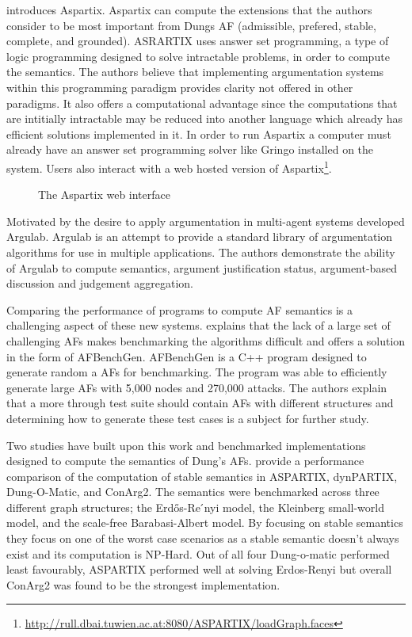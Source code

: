 \cite{egly2008aspartix} introduces Aspartix. Aspartix can compute the extensions that the authors consider to be most important from Dungs AF (admissible, prefered, stable, complete, and grounded). ASRARTIX uses answer set programming, a type of logic programming designed to solve intractable problems, in order to compute the semantics. The authors believe that implementing argumentation systems within this programming paradigm provides clarity not offered in other paradigms. It also offers a computational advantage since the computations that are intitially intractable may be reduced into another language which already has efficient solutions implemented in it. In order to run Aspartix a computer must already have an answer set programming solver like Gringo installed on the system. Users also interact with a web hosted version of Aspartix\footnote{\url{http://rull.dbai.tuwien.ac.at:8080/ASPARTIX/loadGraph.faces}}.

\begin{figure}
    \centering
    \hfill
    \caption{The Aspartix web interface}
    \label{fig:three graphs}
\end{figure}

Motivated by the desire to apply argumentation in multi-agent systems \cite{podlaszewski2011implementation} developed Argulab. Argulab is an attempt to provide a standard library of argumentation algorithms for use in multiple applications. The authors demonstrate the ability of Argulab to compute semantics, argument justification status, argument-based discussion and judgement aggregation.

Comparing the performance of programs to compute AF semantics is a challenging aspect of these new systems. \cite{cerutti2014generating} explains that the lack of a large set of challenging AFs makes benchmarking the algorithms difficult and offers a solution in the form of AFBenchGen.
AFBenchGen is a C++ program designed to generate random a AFs for benchmarking.
The program was able to efficiently generate large AFs with 5,000 nodes and 270,000 attacks. The authors explain that a more through test suite should contain AFs with different structures and determining how to generate these test cases is a subject for further study.

Two studies have built upon this work and benchmarked implementations designed to compute the semantics of Dung's AFs. \cite{bistarelli2014benchmarking} provide a performance comparison of the computation of stable semantics in ASPARTIX, dynPARTIX, Dung-O-Matic, and ConArg2. The semantics were benchmarked across three different graph structures; the Erdős-Re ́nyi model, the Kleinberg small-world model, and the scale-free Barabasi-Albert model. By focusing on stable semantics they focus on one of the worst case scenarios as a stable semantic doesn't always exist and its computation is NP-Hard. Out of all four Dung-o-matic performed least favourably, ASPARTIX performed well at solving Erdos-Renyi but overall ConArg2 was found to be the strongest implementation.

